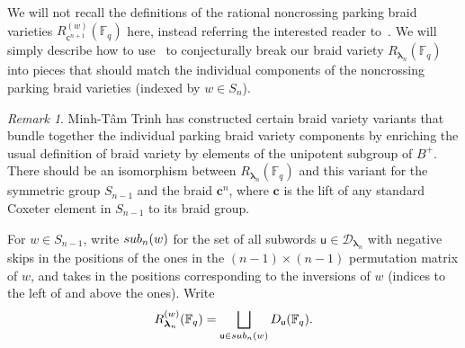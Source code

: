 \documentclass[a4paper,10pt,leqno]{amsart}
\numberwithin{equation}{section}
\theoremstyle{definition}
\theoremstyle{remark}
\newtheorem{remark}[theorem]{Remark}
\renewcommand{\u}{\mathsf{u}}
\renewcommand{\S}{\textsc{sub}}
\newcommand{\FF}{\mathbb{F}}
\newcommand{\blambda}{\bm{\lambda}}
\begin{document}
We will not recall the definitions of the rational noncrossing parking braid varieties $R_{\mathsf{c}^{n+1}}^{(w)}(\FF_q)$ here, instead referring the interested reader to~\cite{galashin2022rational}.  We will simply describe how to use~ to conjecturally break our braid variety $R_{\blambda_n}(\FF_q)$ into pieces that should match the individual components of the noncrossing parking braid varieties (indexed by $w \in S_n$).

\begin{remark}
Minh-T\^am Trinh has constructed certain braid variety variants that bundle together the individual parking braid variety components by enriching the usual definition of braid variety by elements of the unipotent subgroup of $B^+$.  There should be an isomorphism between $R_{\blambda_n}(\FF_q)$ and this variant for the symmetric group $S_{n-1}$ and the braid $\mathbf{c}^{n}$, where $\mathbf{c}$ is the lift of any standard Coxeter element in $S_{n-1}$ to its braid group.
\end{remark}

For $w \in S_{n-1}$, write $\S_n(w)$ for the set of all subwords $\u \in \mathcal{D}_{\blambda_n}$ with negative skips in the positions of the ones in the $(n-1)\times(n-1)$ permutation matrix of $w$, and takes in the positions corresponding to the inversions of $w$ (indices to the left of and above the ones).  Write \[R_{\blambda_n}^{(w)}(\FF_q) = \bigsqcup_{\u \in \S_n(w)} D_\u(\FF_q).\]
\end{document}
